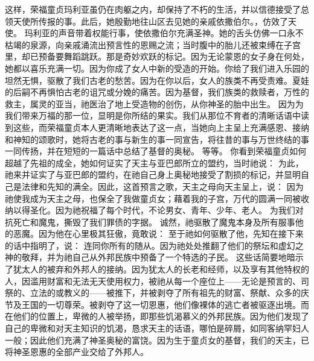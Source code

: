 这样，荣福童贞玛利亚虽仍在肉躯之内，却保持了不朽的生活，并以信德接受了总领天使所传报的事。此后，她殷勤地往山区去见她的亲戚依撒伯尔。，仿效了天使。 玛利亚的声音带着权能行事，使依撒伯尔充满圣神。她的舌头仿佛一口永不枯竭的泉源，向亲戚涌流出预言性的恩赐之流；当时腹中的胎儿还被束缚在子宫里，却已预备要舞蹈跳跃。那是奇妙欢跃的标记。因为无论蒙恩的女子身在何处，她都以喜乐充满一切。因为你成了女人中新的受造的开始。你给了我们进入乐园的坦然无惧，驱散了我们古老的愁苦。因为在你以后，女人的族类不再受责难。夏娃的后嗣不再惧怕古老的诅咒或分娩的痛苦。因为基督，我们族类的救赎者，万性的救主，属灵的亚当，祂医治了地上受造物的创伤，从你神圣的胎中出生。 因为为我们带来万福的那一位，显明是你所结的果实。我们从那位不育者的清晰话语中读到这些，而荣福童贞本人更清晰地表达了这一点，当她向上主呈上充满感恩、接纳和神知的颂歌时，她将古老的事与新生的事一同宣告，将往昔的事与万世终结的事一同传扬，并在短短的一篇话中总结了基督的奥秘。 等等。 你看到荣福童贞如何超越了先祖的成全，她如何证实了天主与亚巴郎所立的盟约，当时祂说： 为此，祂来并证实了与亚巴郎的盟约，在祂自己身上奥秘地接受了割损的标记，并显明自己是法律和先知的满全。因此，这首预言之歌，天主之母向天主呈上，说： 因为祂使我成为天主之母，也保全了我做童贞女；藉着我的子宫，万代的圆满一同被收纳以得圣化。因为祂祝福了每个时代，不论男女、青年、少年、老人。 为我们对抗死亡和魔鬼，撕毁了我们罪债的字据。 诚然，祂驱散了魔鬼本身及所有服事他的恶魔。因为他在心里极其狂傲，竟敢说： 至于祂如何驱散了他，先知在接下来的话中指明了，说： 连同你所有的随从。因为祂处处推翻了他们的祭坛和虚幻之神的敬拜，并为祂自己从外邦民族中预备了一个特选的子民。 这些话简要地暗示了犹太人的被弃和外邦人的接纳。因为犹太人的长老和经师，以及享有其他特权的人，因滥用财富和无法无天使用权力，被祂从每一个座位上——无论是预言的、司祭的、立法的或教义的——被推下，并被剥夺了所有祖先的财富、祭献、众多的庆节及王国的一切尊荣。被剥夺了这一切恩惠，他们像裸体的逃亡者被驱逐出境。而在他们的位置上，卑微的人被举扬，即那些饥渴慕义的外邦民族。因为他们发现了自己的卑微和对天主知识的饥渴，恳求天主的话语，哪怕是碎屑，如同客纳罕妇人一般；因此他们充满了神圣奥秘的富饶。因为生于童贞女的基督，我们的天主，已将神圣恩惠的全部产业交给了外邦人。 